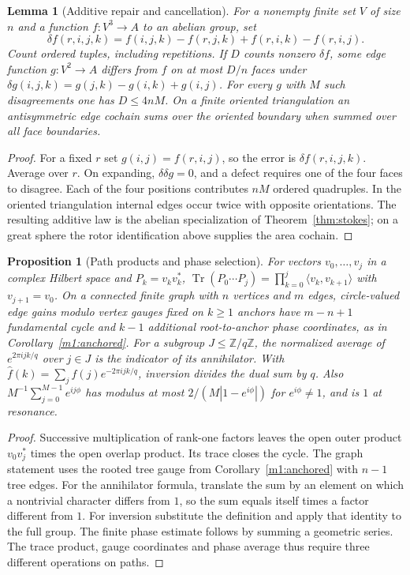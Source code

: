 \documentclass[11pt,reqno]{amsart}
\newtheorem{proposition}[theorem]{Proposition}
\newtheorem{lemma}[theorem]{Lemma}
\theoremstyle{definition}
\theoremstyle{remark}
\numberwithin{equation}{section}
\begin{document}
\begin{lemma}[Additive repair and cancellation]\label{m8:repair}
For a nonempty finite set $V$ of size $n$ and a function
$f:V^3\to A$ to an abelian group, set
\[
 \delta f(r,i,j,k)=f(i,j,k)-f(r,j,k)+f(r,i,k)-f(r,i,j).
\]
Count ordered tuples, including repetitions. If $D$ counts nonzero
$\delta f$, some edge function $g:V^2\to A$ differs from $f$ on at
most $D/n$ faces under $\delta g(i,j,k)=g(j,k)-g(i,k)+g(i,j)$.
For every $g$ with $M$ such disagreements one has $D\le4nM$.
On a finite oriented triangulation an antisymmetric edge cochain sums
over the oriented boundary when summed over all face boundaries.
\end{lemma}
\begin{proof}
For a fixed $r$ set $g(i,j)=f(r,i,j)$, so the error is
$\delta f(r,i,j,k)$. Average over $r$. On expanding,
$\delta\delta g=0$, and a defect requires one of the four faces to
disagree. Each of the four positions contributes $nM$ ordered
quadruples. In the oriented triangulation internal edges occur twice
with opposite orientations. The resulting additive law is the
abelian specialization of Theorem~\ref{thm:stokes}; on a great sphere
the rotor identification above supplies the area cochain.
\end{proof}

\begin{proposition}[Path products and phase selection]\label{m8:phaseselection}
For vectors $v_0,\dots,v_j$ in a complex Hilbert space and
$P_k=v_kv_k^*$,
$\operatorname{Tr}(P_0\cdots P_j)=\prod_{k=0}^j\langle v_k,v_{k+1}\rangle$
with $v_{j+1}=v_0$. On a connected finite graph with $n$ vertices and
$m$ edges, circle-valued edge gains modulo vertex gauges fixed on
$k\ge1$ anchors have $m-n+1$ fundamental cycle and $k-1$ additional
root-to-anchor phase coordinates, as in Corollary~\ref{m1:anchored}.
For a subgroup $J\le\mathbb Z/q\mathbb Z$, the normalized average
of $e^{2\pi i jk/q}$ over $j\in J$ is the indicator of its annihilator.
With $\widehat f(k)=\sum_j f(j)e^{-2\pi i jk/q}$, inversion divides
the dual sum by $q$. Also
$M^{-1}\sum_{j=0}^{M-1}e^{ij\phi}$ has modulus at most
$2/(M|1-e^{i\phi}|)$ for $e^{i\phi}\ne1$, and is $1$ at resonance.
\end{proposition}
\begin{proof}
Successive multiplication of rank-one factors leaves the open outer
product $v_0v_j^*$ times the open overlap product. Its trace closes the
cycle. The graph statement uses the rooted tree gauge from
Corollary~\ref{m1:anchored} with $n-1$ tree edges. For the annihilator
formula, translate the sum by an element on which a nontrivial
character differs from $1$, so the sum equals
itself times a factor different from $1$. For inversion substitute
the definition and apply that identity to the full group. The
finite phase estimate follows by summing a geometric series.
The trace product, gauge coordinates and phase average thus require
three different operations on paths.
\end{proof}
\end{document}
